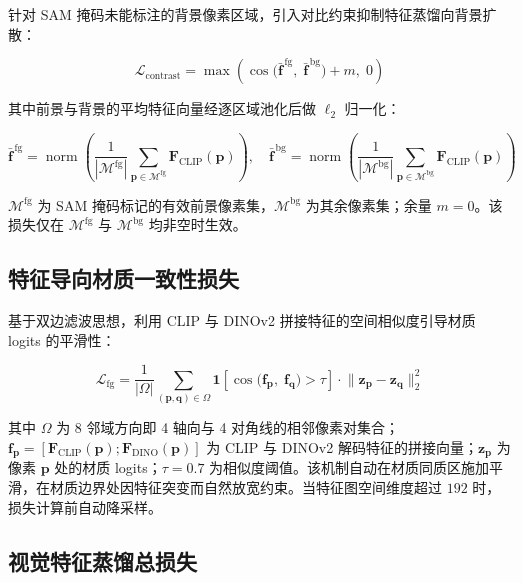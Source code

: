 针对 SAM 掩码未能标注的背景像素区域，引入对比约束抑制特征蒸馏向背景扩散：

\begin{equation}
\mathcal{L}_{\text{contrast}} = \max\left( \cos\big( \bar{\mathbf{f}}^{\,\text{fg}},\; \bar{\mathbf{f}}^{\,\text{bg}} \big) + m,\; 0 \right)
\label{eq:contrast}
\end{equation}

其中前景与背景的平均特征向量经逐区域池化后做 $\ell_2$ 归一化：

\begin{equation}
\bar{\mathbf{f}}^{\,\text{fg}} = \operatorname{norm}\!\left( \frac{1}{|\mathcal{M}^{\text{fg}}|} \sum_{\mathbf{p} \in \mathcal{M}^{\text{fg}}} \mathbf{F}_{\text{CLIP}}(\mathbf{p}) \right),\quad
\bar{\mathbf{f}}^{\,\text{bg}} = \operatorname{norm}\!\left( \frac{1}{|\mathcal{M}^{\text{bg}}|} \sum_{\mathbf{p} \in \mathcal{M}^{\text{bg}}} \mathbf{F}_{\text{CLIP}}(\mathbf{p}) \right)
\label{eq:contrast_fg_bg}
\end{equation}

$\mathcal{M}^{\text{fg}}$ 为 SAM 掩码标记的有效前景像素集，$\mathcal{M}^{\text{bg}}$ 为其余像素集；余量 $m = 0$。该损失仅在 $\mathcal{M}^{\text{fg}}$ 与 $\mathcal{M}^{\text{bg}}$ 均非空时生效。

\subsection{特征导向材质一致性损失}

基于双边滤波思想，利用 CLIP 与 DINOv2 拼接特征的空间相似度引导材质 logits 的平滑性：

\begin{equation}
\mathcal{L}_{\text{fg}} = \frac{1}{|\Omega|} \sum_{(\mathbf{p}, \mathbf{q}) \in \Omega} \mathbf{1}\!\left[ \cos\!\big( \mathbf{f}_{\mathbf{p}},\; \mathbf{f}_{\mathbf{q}} \big) > \tau \right] \cdot \big\| \mathbf{z}_{\mathbf{p}} - \mathbf{z}_{\mathbf{q}} \big\|_2^2
\label{eq:feature_guided}
\end{equation}

其中 $\Omega$ 为 8 邻域方向即 4 轴向与 4 对角线的相邻像素对集合；$\mathbf{f}_{\mathbf{p}} = [\mathbf{F}_{\text{CLIP}}(\mathbf{p}); \mathbf{F}_{\text{DINO}}(\mathbf{p})]$ 为 CLIP 与 DINOv2 解码特征的拼接向量；$\mathbf{z}_{\mathbf{p}}$ 为像素 $\mathbf{p}$ 处的材质 logits；$\tau = 0.7$ 为相似度阈值。该机制自动在材质同质区施加平滑，在材质边界处因特征突变而自然放宽约束。当特征图空间维度超过 $192$ 时，损失计算前自动降采样。

\subsection{视觉特征蒸馏总损失}

